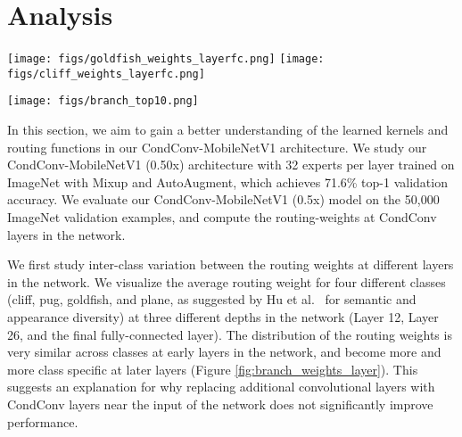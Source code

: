 \documentclass{article}
\def\codename{CondConv}
\begin{document}
\section{Analysis} \label{analysis}


\begin{figure*}[t]\centering
\texttt{[image: figs/goldfish\_weights\_layerfc.png]}
\texttt{[image: figs/cliff\_weights\_layerfc.png]}
\caption{Routing weights in the final \codename{} layer in our \codename{}-MobileNetV1 (0.5x) model for 2 classes averaged across the ImageNet validation set. Error bars indicate one standard deviation.}
\label{fig:perclass_branch_weights}

\bigskip

\centering
\texttt{[image: figs/branch\_top10.png]}
\caption{Top 10 classes with highest mean routing weight for 4 different experts in the final \codename{} layer in our \codename{}-MobileNetV1 (0.5x) model, as measured across the ImageNet validation set. Expert 1 is most activated for wheeled vehicles; expert 2 is most activated for rectangular structures; expert 3 is most activated for cylindrical household objects; expert 4 is most activated for brown and black dog breeds.}
\label{fig:branch_top10}
\end{figure*}

In this section, we aim to gain a better understanding of the learned kernels and routing functions in our \codename{}-MobileNetV1 architecture. We study our \codename{}-MobileNetV1 (0.50x) architecture with 32 experts per layer trained on ImageNet with Mixup and AutoAugment, which achieves 71.6\% top-1 validation accuracy. We evaluate our \codename{}-MobileNetV1 (0.5x) model on the 50,000 ImageNet validation examples, and compute the routing-weights at \codename{} layers in the network.

We first study inter-class variation between the routing weights at different layers in the network. We visualize the average routing weight for four different classes (cliff, pug, goldfish, and plane, as suggested by Hu et al.~\cite{hu2018squeeze} for semantic and appearance diversity) at three different depths in the network (Layer 12, Layer 26, and the final fully-connected layer). The distribution of the routing weights is very similar across classes at early layers in the network, and become more and more class specific at later layers (Figure \ref{fig:branch_weights_layer}). This suggests an explanation for why replacing additional convolutional layers with \codename{} layers near the input of the network does not significantly improve performance.
\end{document}

